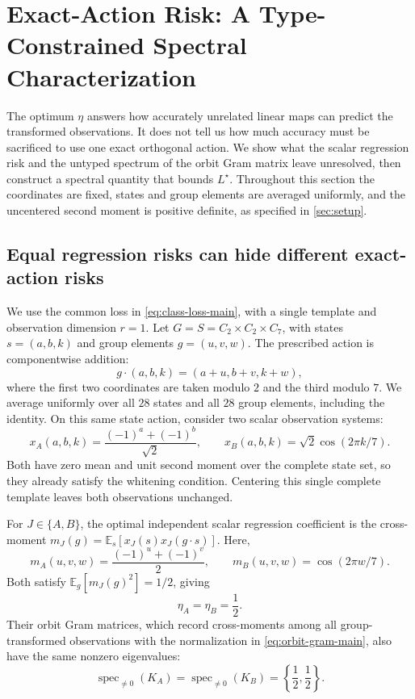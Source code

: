 \section{Exact-Action Risk: A Type-Constrained Spectral Characterization}
\label{sec:boundaries}
The optimum $\eta$ answers how accurately unrelated linear maps can predict the transformed observations. It does not tell us how much accuracy must be sacrificed to use one exact orthogonal action. We show what the scalar regression risk and the untyped spectrum of the orbit Gram matrix leave unresolved, then construct a spectral quantity that bounds $L^\star$. Throughout this section the coordinates are fixed, states and group elements are averaged uniformly, and the uncentered second moment is positive definite, as specified in \cref{sec:setup}.

\subsection{Equal regression risks can hide different exact-action risks}

We use the common loss in \cref{eq:class-loss-main}, with a
single template and observation dimension $r=1$.
Let $G=S=C_2\times C_2\times C_7$, with states
$s=(a,b,k)$ and group elements $g=(u,v,w)$.
The prescribed action is componentwise addition:
\[
 g\cdot(a,b,k)=(a+u,b+v,k+w),
\]
where the first two coordinates are taken modulo $2$ and
the third modulo $7$.
We average uniformly over all $28$ states and all $28$
group elements, including the identity.
On this same state action, consider two scalar observation
systems:
\[
 x_A(a,b,k)=\frac{(-1)^a+(-1)^b}{\sqrt{2}},
 \qquad
 x_B(a,b,k)=\sqrt{2}\cos(2\pi k/7).
\]
Both have zero mean and unit second moment over the complete
state set, so they already satisfy the whitening condition.
Centering this single complete template leaves both
observations unchanged.

For $J\in\{A,B\}$, the optimal independent scalar regression
coefficient is the cross-moment
$m_J(g)=\mathbb E_s[x_J(s)x_J(g\cdot s)]$.
Here,
\[
 m_A(u,v,w)=\frac{(-1)^u+(-1)^v}{2},
 \qquad
 m_B(u,v,w)=\cos(2\pi w/7).
\]
Both satisfy $\mathbb E_g[m_J(g)^2]=1/2$, giving
\[
 \eta_A=\eta_B=\frac12.
\]
Their orbit Gram matrices, which record cross-moments among
all group-transformed observations with the normalization
in \cref{eq:orbit-gram-main}, also have the same nonzero
eigenvalues:
\[
 \operatorname{spec}_{\ne 0}(K_A)
 =
 \operatorname{spec}_{\ne 0}(K_B)
 =
 \left\{\frac12,\frac12\right\}.
\]

